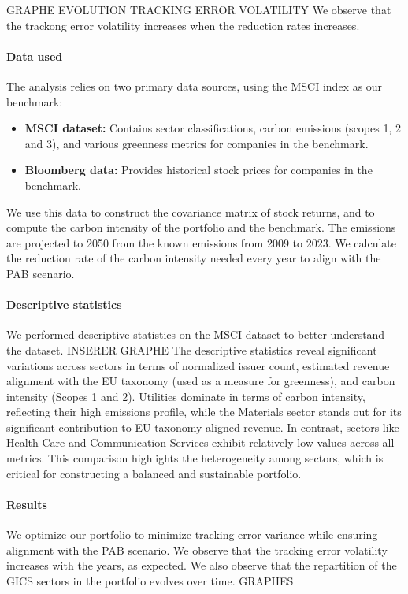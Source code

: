 GRAPHE EVOLUTION TRACKING ERROR VOLATILITY
We observe that the trackong error volatility increases when the reduction rates increases.


\paragraph{Data used}
The analysis relies on two primary data sources, using the MSCI index as our benchmark:  
\begin{itemize}
    \item \textbf{MSCI dataset:} Contains sector classifications, carbon emissions (scopes 1, 2 and 3), and various greenness metrics for companies in the benchmark.  
    \item \textbf{Bloomberg data:} Provides historical stock prices for companies in the benchmark.
\end{itemize}
We use this data to construct the covariance matrix of stock returns, and to compute the carbon intensity of the portfolio and the benchmark.
The emissions are projected to 2050 from the known emissions from 2009 to 2023.
We calculate the reduction rate of the carbon intensity needed every year to align with the PAB scenario. 

\paragraph{Descriptive statistics}
We performed descriptive statistics on the MSCI dataset to better understand the dataset.
INSERER GRAPHE
The descriptive statistics reveal significant variations across sectors in terms of normalized issuer count, estimated revenue alignment with the EU taxonomy (used as a measure for greenness), and carbon intensity (Scopes 1 and 2).
Utilities dominate in terms of carbon intensity, reflecting their high emissions profile, while the Materials sector stands out for its significant contribution to EU taxonomy-aligned revenue.
In contrast, sectors like Health Care and Communication Services exhibit relatively low values across all metrics. 
This comparison highlights the heterogeneity among sectors, which is critical for constructing a balanced and sustainable portfolio.

\paragraph{Results}
We optimize our portfolio to minimize tracking error variance while ensuring alignment with the PAB scenario. 
We observe that the tracking error volatility increases with the years, as expected.
We also observe that the repartition of the GICS sectors in the portfolio evolves over time.
GRAPHES




